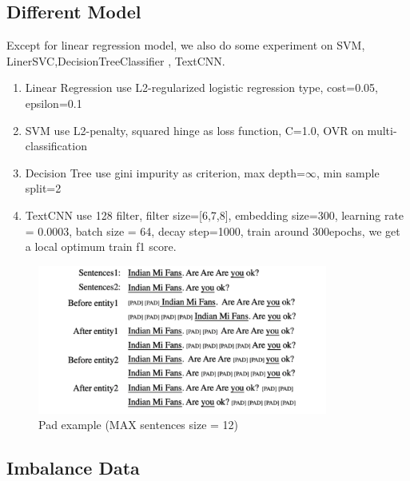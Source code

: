 

\subsection{Different Model}
\label{sec:different_model}

Except for linear regression model, we also do some experiment on SVM, LinerSVC,DecisionTreeClassifier , TextCNN.

\begin{enumerate}
    \item Linear Regression use L2-regularized logistic regression type, cost=0.05, epsilon=0.1
    \item SVM use L2-penalty, squared hinge as loss function, C=1.0, OVR on multi-classification
    \item Decision Tree use gini impurity as criterion, max depth=$\infty$, min sample split=2
    \item TextCNN use 128 filter, filter size=[6,7,8], embedding size=300, learning rate = 0.0003, batch size = 64, decay step=1000, train around 300epochs, we get a local optimum train f1 score.
\end{enumerate}



\begin{figure}[ht]
    \begin{center}
    \includegraphics[width=0.85\textwidth]{figures/pad_example.pdf}
    \end{center}
    \caption{Pad example (MAX sentences size = 12)}
    \label{fig:pad_example}
\end{figure}


\subsection{Imbalance Data}
\label{sec:impalance_data}

